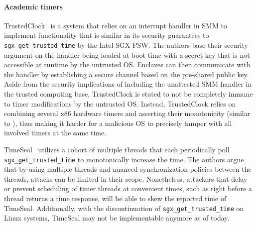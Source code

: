 \paragraph{Academic timers}

TrustedClock~\cite{jigsaw} is a system that relies on an interrupt handler in
\ac{SMM} to implement functionality that is similar in its security guarantees
to \texttt{sgx\_get\_trusted\_time} by the Intel SGX \ac{PSW}. The authors base
their security argument on the handler being loaded at boot time with a secret
key that is not accessible at runtime by the untrusted OS. Enclaves can then
communicate with the handler by establishing a secure channel based on the
pre-shared public key. Aside from the security implications of including the
unattested SMM handler in the trusted computing base, TrustedClock is stated to
not be completely immune to timer modifications by the untrusted OS. Instead,
TrustedClock relies on combining several x86 hardware timers and asserting their
monotonicity (similar to \Tone{}), thus making it harder for a malicious OS to
precisely tamper with all involved timers at the same time.

TimeSeal~\cite{anwar2019securing} utilizes a cohort of multiple threads that
each periodically poll \texttt{sgx\_get\_trusted\_time} to monotonically
increase the time. The authors argue that by using multiple threads and nuanced
synchronization policies between the threads, attacks can be limited in their
scope. Nonetheless, attackers that delay or prevent scheduling of timer threads
at convenient times, such as right before a thread returns a time response, will
be able to skew the reported time of TimeSeal. Additionally, with the
discontinuation of \texttt{sgx\_get\_trusted\_time} on Linux systems, TimeSeal
may not be implementable anymore as of today.

